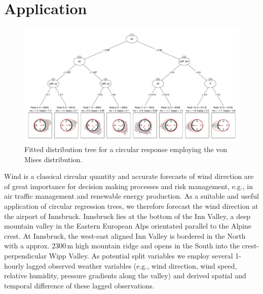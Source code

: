 \documentclass[twoside]{report}
\begin{document}



\section{Application}

\begin{figure}
\includegraphics[height = .5\textheight,angle=90,origin=c]{circtree_plot_big.pdf}
\caption{Fitted distribution tree for a circular response employing the von Mises distribution.}
\label{fig:tree}
\end{figure}

Wind is a classical circular quantity and accurate forecasts of wind direction
are of great importance for decision making processes and risk management,
e.g., in air traffic management and renewable energy production. As a suitable
and useful application of circular regression trees, we therefore forecast the
wind direction at the airport of Innsbruck. Innsbruck lies at the bottom of the
Inn Valley, a deep mountain valley in the Eastern European Alps orientated
parallel to the Alpine crest. At Innsbruck, the west-east aligned Inn Valley is
bordered in the North with a approx. 2300\,m high mountain ridge and opens in
the South into the crest-perpendicular Wipp Valley. As potential split
variables we employ several 1-hourly lagged observed weather variables (e.g.,
wind direction, wind speed, relative humidity, pressure gradients along the
valley) and derived spatial and temporal difference of these lagged
observations. 
\end{document}
